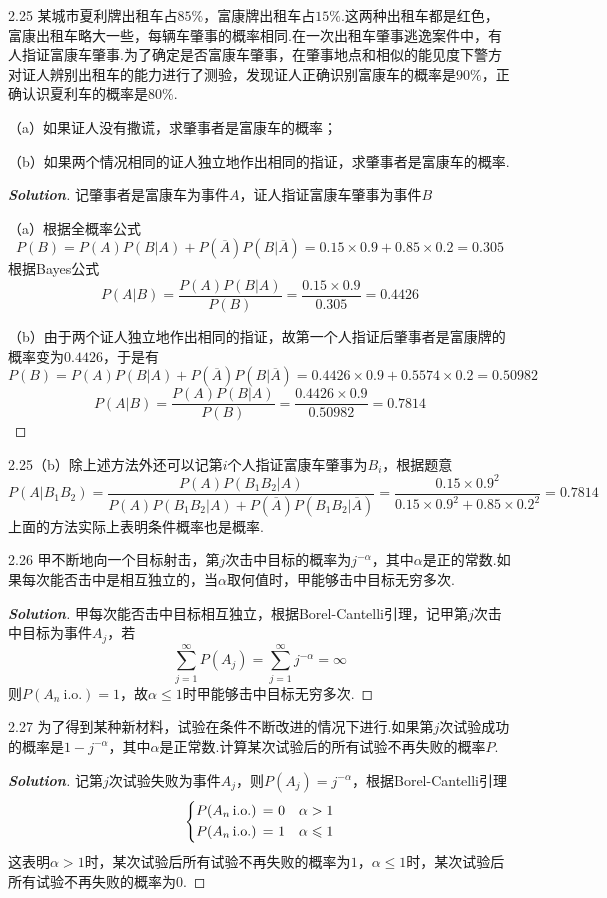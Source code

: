 \documentclass[10pt, a4paper, oneside]{ctexart}
\newenvironment{solution}{\begin{proof}[\bf Solution]}{\end{proof}}
\begin{document}
2.25 某城市夏利牌出租车占$85\%$，富康牌出租车占$15\%$.这两种出租车都是红色，富康出租车略大一些，每辆车肇事的概率相同.在一次出租车肇事逃逸案件中，有人指证富康车肇事.为了确定是否富康车肇事，在肇事地点和相似的能见度下警方对证人辨别出租车的能力进行了测验，发现证人正确识别富康车的概率是$90\%$，正确认识夏利车的概率是$80\%$.

（a）如果证人没有撒谎，求肇事者是富康车的概率；

（b）如果两个情况相同的证人独立地作出相同的指证，求肇事者是富康车的概率.
\begin{solution}
记肇事者是富康车为事件$A$，证人指证富康车肇事为事件$B$

（a）根据全概率公式
\[P(B) = P(A)P(B|A) + P(\overline A )P(B|\overline A ) = 0.15 \times 0.9 + 0.85 \times 0.2 = 0.305\]
根据Bayes公式
\[P(A|B) = \frac{{P(A)P(B|A)}}{{P(B)}} = \frac{{0.15 \times 0.9}}{{0.305}} = 0.4426\]

（b）由于两个证人独立地作出相同的指证，故第一个人指证后肇事者是富康牌的概率变为$0.4426$，于是有
\[P(B) = P(A)P(B|A) + P(\overline A )P(B|\overline A ) = 0.4426 \times 0.9 + 0.5574 \times 0.2 = 0.50982\]
\[P(A|B) = \frac{{P(A)P(B|A)}}{{P(B)}} = \frac{{0.4426 \times 0.9}}{{0.50982}} = 0.7814\]
\end{solution}
\begin{remark}
2.25（b）除上述方法外还可以记第$i$个人指证富康车肇事为$B_i$，根据题意
\[P(A|{B_1}{B_2}) = \frac{{P(A)P({B_1}{B_2}|A)}}{{P(A)P({B_1}{B_2}|A) + P(\overline A )P({B_1}{B_2}|\overline A )}} = \frac{{0.15 \times {{0.9}^2}}}{{0.15 \times {{0.9}^2} + 0.85 \times {{0.2}^2}}} = 0.7814\]
上面的方法实际上表明条件概率也是概率.
\end{remark}

2.26 甲不断地向一个目标射击，第$j$次击中目标的概率为$j^{-\alpha}$，其中$\alpha$是正的常数.如果每次能否击中是相互独立的，当$\alpha$取何值时，甲能够击中目标无穷多次.
\begin{solution}
甲每次能否击中目标相互独立，根据Borel-Cantelli引理，记甲第$j$次击中目标为事件$A_j$，若
\[\sum\limits_{j = 1}^\infty  {P({A_j})}  = \sum\limits_{j = 1}^\infty  {{j^{ - \alpha }}}  = \infty \]
则$P(A_n\: \text{i.o.})=1$，故$\alpha\leqslant 1$时甲能够击中目标无穷多次.
\end{solution}

2.27 为了得到某种新材料，试验在条件不断改进的情况下进行.如果第$j$次试验成功的概率是$1-j^{-\alpha}$，其中$\alpha$是正常数.计算某次试验后的所有试验不再失败的概率$P$.
\begin{solution}
记第$j$次试验失败为事件$A_j$，则$P(A_j)=j^{-\alpha}$，根据Borel-Cantelli引理
\[\left\{ \begin{gathered}
  P({A_n}\,{\text{i}}.{\text{o}}{\text{.) = 0}} \hfill \quad \alpha>1 \\
  P({A_n}\,{\text{i}}.{\text{o}}{\text{.) = 1}} \hfill \quad \alpha\leqslant 1\\ 
\end{gathered}  \right.\]
这表明$\alpha>1$时，某次试验后所有试验不再失败的概率为$1$，$\alpha\leqslant 1$时，某次试验后所有试验不再失败的概率为$0$.
\end{solution}
\end{document}
